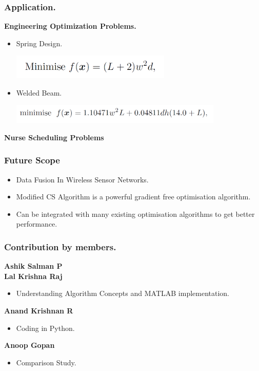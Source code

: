 \documentclass[10pt]{beamer}
\begin{document}
\begin{frame}
  \frametitle{Application.}
  \textbf{Engineering Optimization Problems.}
  \begin{itemize}
  	\item Spring Design.
  	\begin{center}
  	\includegraphics[width=0.60\textwidth]{ac.png}
  	\end{center}
  	\item Welded Beam.
  	\begin{center}
  	\includegraphics[width=0.80\textwidth]{ad.png}
  	\end{center}
  \end{itemize}
  \textbf{Nurse Scheduling Problems}\\
\end{frame}

\begin{frame}
	\frametitle{Future Scope}
	\begin{itemize}
	\item Data Fusion In Wireless Sensor Networks.
	\item Modified CS Algorithm is a powerful gradient free optimisation algorithm.
	\item Can be integrated with many existing optimisation algorithms to get better performance.
	\end{itemize}
\end{frame}


\begin{frame}
  \frametitle{Contribution by members.}
  \textbf{Ashik Salman P\\ Lal Krishna Raj}
  \begin{itemize}
  	\item Understanding Algorithm Concepts and MATLAB implementation.
  \end{itemize}
  \textbf{Anand Krishnan R}
  \begin{itemize}
  	\item Coding in Python.
  \end{itemize}
  \textbf{Anoop Gopan}
  \begin{itemize}
  	\item Comparison Study.
  \end{itemize}
\end{frame}
\end{document}
